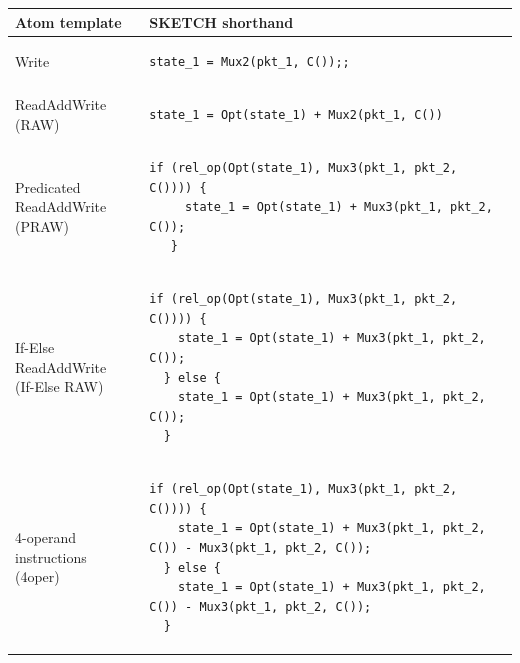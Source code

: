 \label{s:eval}
\begin{table}[!t]
  \begin{scriptsize}
  \begin{tabular}{|p{}|p{}|}
  \hline
  Atom template & SKETCH shorthand\\
  \hline
  Write &
  {\begin{lstlisting}[style=customctable]
  state_1 = Mux2(pkt_1, C());;
  \end{lstlisting}} \\
  \hline
  ReadAddWrite (RAW) &
  {\begin{lstlisting}[style=customctable]
  state_1 = Opt(state_1) + Mux2(pkt_1, C())
  \end{lstlisting}} \\
  \hline
  \pbox{0.15\textwidth}
  {Predicated\\
  ReadAddWrite (PRAW)} &
  {\begin{lstlisting}[style=customctable]
   if (rel_op(Opt(state_1), Mux3(pkt_1, pkt_2, C()))) {
     state_1 = Opt(state_1) + Mux3(pkt_1, pkt_2, C());
   }
  \end{lstlisting}} \\
  \hline
  \pbox{0.15\textwidth}
  {If-Else\\
   ReadAddWrite\\
   (If-Else RAW)} &
  {\begin{lstlisting}[style=customctable]
  if (rel_op(Opt(state_1), Mux3(pkt_1, pkt_2, C()))) {
    state_1 = Opt(state_1) + Mux3(pkt_1, pkt_2, C());
  } else {
    state_1 = Opt(state_1) + Mux3(pkt_1, pkt_2, C());
  }
  \end{lstlisting}} \\
  \hline
  \pbox{0.15\textwidth}
  {4-operand instructions\\
   (4oper)} &
  {\begin{lstlisting}[style=customctable]
  if (rel_op(Opt(state_1), Mux3(pkt_1, pkt_2, C()))) {
    state_1 = Opt(state_1) + Mux3(pkt_1, pkt_2, C()) - Mux3(pkt_1, pkt_2, C());
  } else {
    state_1 = Opt(state_1) + Mux3(pkt_1, pkt_2, C()) - Mux3(pkt_1, pkt_2, C());
  }
  \end{lstlisting}} \\

\end{tabular}
\end{scriptsize}
\end{table}
